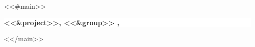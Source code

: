 \begin{titlepage}
  \centering
  \phantom{}
  \vspace{2cm}

  \begin{minipage}[c]{0.2\paperwidth}
    \centering
    \makebox[0pt]{
      
    }
  \end{minipage}

<<#main>>
  \vspace{4cm}
  {\selectfont
    \colorbox{white}{
      \begin{minipage}{\textwidth}
        \centering
        \color{AAUblue1}

        \vspace{2em}
        {\Huge\bfseries\projecttitle}

        {\Large\bfseries\projectsubtitle}

        \bigskip
        \parbox{\textwidth}{\centering\large\projectauthors}

        \bigskip
        {\bfseries\large{\projectnumber}<<&project>>, <<&group>> \projectgroup, \projectdegree}
        \vspace{2em}
      \end{minipage}
    }
  }
<</main>>

\end{titlepage}
